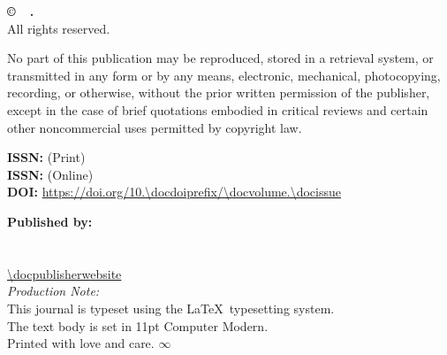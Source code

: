 \begin{flushleft}
    \small
    \setlength{\parskip}{1em}

    \textbf{\copyright\ \docyear\ \docjournal.} \\
    All rights reserved.

    No part of this publication may be reproduced, stored in a retrieval system, or transmitted in any form or by any means, electronic, mechanical, photocopying, recording, or otherwise, without the prior written permission of the publisher, except in the case of brief quotations embodied in critical reviews and certain other noncommercial uses permitted by copyright law.

    \textbf{ISSN:} \texttt{\docissnprint} (Print) \\
    \textbf{ISSN:} \texttt{\docissnonline} (Online) \\
    \textbf{DOI:} \url{https://doi.org/10.\docdoiprefix/\docvolume.\docissue}

    \textbf{Published by:} \\
    \docpublisher \\
    \docpublisheraddress \\
    \url{\docpublisherwebsite} \\

    \vspace{2em}
    \textit{Production Note:} \\
    This journal is typeset using the \LaTeX\ typesetting system. \\
    The text body is set in 11pt Computer Modern. \\
    Printed with love and care. $\infty$
\end{flushleft}

